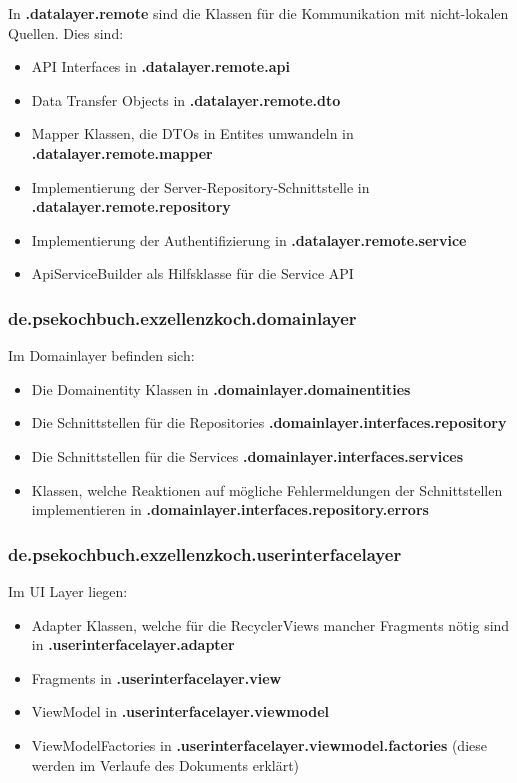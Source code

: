 In \textbf{.datalayer.remote} sind die Klassen für die Kommunikation mit nicht-lokalen Quellen. Dies sind: 
\begin{itemize}
	\item API Interfaces in \textbf{.datalayer.remote.api}
	\item Data Transfer Objects in \textbf{.datalayer.remote.dto}
	\item Mapper Klassen, die DTOs in Entites umwandeln in \textbf{.datalayer.remote.mapper}
	\item Implementierung der Server-Repository-Schnittstelle in \textbf{.datalayer.remote.repository}
	\item Implementierung der Authentifizierung in \textbf{.datalayer.remote.service}
	\item ApiServiceBuilder als Hilfsklasse für die Service API 
\end{itemize}

\subsubsection{de.psekochbuch.exzellenzkoch.domainlayer}
Im Domainlayer befinden sich:
\begin{itemize}
	\item Die Domainentity Klassen in \textbf{.domainlayer.domainentities} 
	\item Die Schnittstellen für die Repositories \textbf{.domainlayer.interfaces.repository}
	\item Die Schnittstellen für die Services \textbf{.domainlayer.interfaces.services}
	\item Klassen, welche Reaktionen auf mögliche Fehlermeldungen der Schnittstellen implementieren in \textbf{.domainlayer.interfaces.repository.errors}
\end{itemize}


\subsubsection{de.psekochbuch.exzellenzkoch.userinterfacelayer}
Im UI Layer liegen:
\begin{itemize}
	\item  Adapter Klassen, welche für die RecyclerViews mancher Fragments nötig sind in \textbf{.userinterfacelayer.adapter}
	\item Fragments in \textbf{.userinterfacelayer.view}
	\item ViewModel in \textbf{.userinterfacelayer.viewmodel}
	\item ViewModelFactories in \textbf{.userinterfacelayer.viewmodel.factories} (diese werden im Verlaufe des Dokuments erklärt)
\end{itemize}


